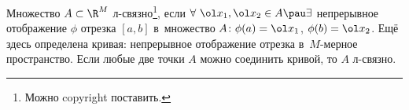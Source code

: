 
	 Множество $A\subset \R^M$ л-связно\footnote{Можно copyright поставить.}, если $\forall\ \ol x_1,\ol x_2\in A\pau \exists$
	 непрерывное отображение $\phi$ отрезка $[a,b]$ в~множество $A\colon \phi(a) = \ol x_1$, $\phi(b) = \ol x_2$.
	 Ещё здесь определена кривая: непрерывное отображение отрезка в~$M$-мерное пространство. Если любые две точки $A$ можно соединить кривой, то $A$ л-связно.
	 